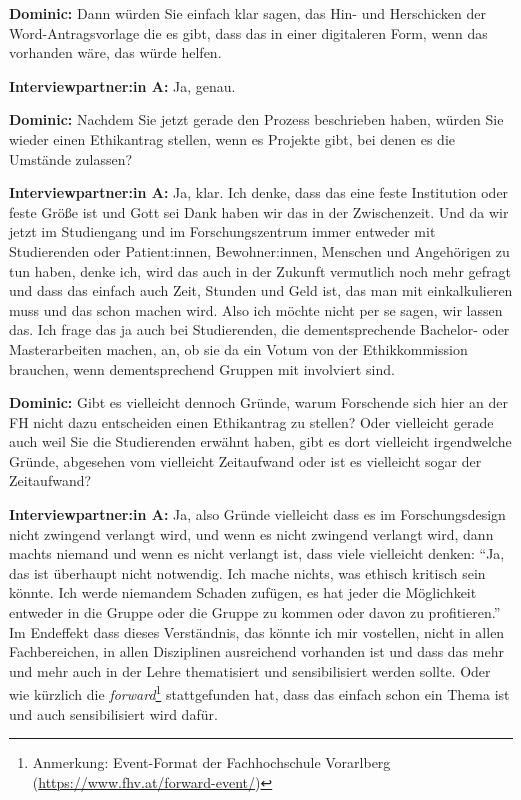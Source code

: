 \documentclass[a4paper,12pt,twoside]{scrreprt}
\begin{document}
\textbf{Dominic:} Dann würden Sie einfach klar sagen, das Hin- und Herschicken der Word-Antragsvorlage die es gibt, dass das in einer digitaleren Form, wenn das vorhanden wäre, das würde helfen.

\textbf{Interviewpartner:in A:} Ja, genau.

\textbf{Dominic:} Nachdem Sie jetzt gerade den Prozess beschrieben haben, würden Sie wieder einen Ethikantrag stellen, wenn es Projekte gibt, bei denen es die Umstände zulassen?

\textbf{Interviewpartner:in A:} Ja, klar. Ich denke, dass das eine feste Institution oder feste Größe ist und Gott sei Dank haben wir das in der Zwischenzeit. Und da wir jetzt im Studiengang und im Forschungszentrum immer entweder mit Studierenden oder Patient:innen, Bewohner:innen, Menschen und Angehörigen zu tun haben, denke ich, wird das auch in der Zukunft vermutlich noch mehr gefragt und dass das einfach auch Zeit, Stunden und Geld ist, das man mit einkalkulieren muss und das schon machen wird. Also ich möchte nicht per se sagen, wir lassen das. Ich frage das ja auch bei Studierenden, die dementsprechende Bachelor- oder Masterarbeiten machen, an, ob sie da ein Votum von der Ethikkommission brauchen, wenn dementsprechend Gruppen mit involviert sind.

\textbf{Dominic:} Gibt es vielleicht dennoch Gründe, warum Forschende sich hier an der FH nicht dazu entscheiden einen Ethikantrag zu stellen? Oder vielleicht gerade auch weil Sie die Studierenden erwähnt haben, gibt es dort vielleicht irgendwelche Gründe, abgesehen vom vielleicht Zeitaufwand oder ist es vielleicht sogar der Zeitaufwand?

\textbf{Interviewpartner:in A:} Ja, also Gründe vielleicht dass es im Forschungsdesign nicht zwingend verlangt wird, und wenn es nicht zwingend verlangt wird, dann machts niemand und wenn es nicht verlangt ist, dass viele vielleicht denken: \enquote{Ja, das ist überhaupt nicht notwendig. Ich mache nichts, was ethisch kritisch sein könnte. Ich werde niemandem Schaden zufügen, es hat jeder die Möglichkeit entweder in die Gruppe oder die Gruppe zu kommen oder davon zu profitieren.} Im Endeffekt dass dieses Verständnis, das könnte ich mir vostellen, nicht in allen Fachbereichen, in allen Disziplinen ausreichend vorhanden ist und dass das mehr und mehr auch in der Lehre thematisiert und sensibilisiert werden sollte. Oder wie kürzlich die \textit{forward}\footnote{Anmerkung: Event-Format der Fachhochschule Vorarlberg (\url{https://www.fhv.at/forward-event/})} stattgefunden hat, dass das einfach schon ein Thema ist und auch sensibilisiert wird dafür.
\end{document}
